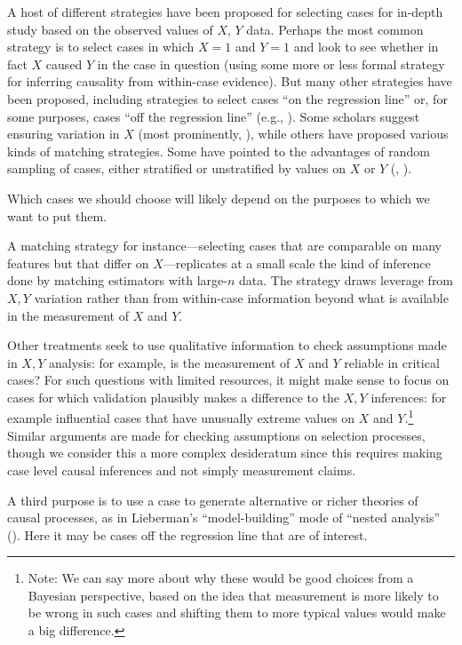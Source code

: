 \documentclass[
  12pt,
]{book}
\begin{document}
A host of different strategies have been proposed for selecting cases for in-depth study based on the observed values of \(X\), \(Y\) data. Perhaps the most common strategy is to select cases in which \(X=1\) and \(Y=1\) and look to see whether in fact \(X\) caused \(Y\) in the case in question (using some more or less formal strategy for inferring causality from within-case evidence). But many other strategies have been proposed, including strategies to select cases ``on the regression line'' or, for some purposes, cases ``off the regression line'' (e.g., \citet{Lieberman2005nested}). Some scholars suggest ensuring variation in \(X\) (most prominently, \citet{king1994designing}), while others have proposed various kinds of matching strategies. Some have pointed to the advantages of random sampling of cases, either stratified or unstratified by values on \(X\) or \(Y\) (\citet{FL2008}, \citet{HerronQuinn}).

Which cases we should choose will likely depend on the purposes to which we want to put them.

A matching strategy for instance---selecting cases that are comparable on many features but that differ on \(X\)---replicates at a small scale the kind of inference done by matching estimators with large-\(n\) data. The strategy draws leverage from \(X,Y\) variation rather than from within-case information beyond what is available in the measurement of \(X\) and \(Y\).

Other treatments seek to use qualitative information to check assumptions made in \(X, Y\) analysis: for example, is the measurement of \(X\) and \(Y\) reliable in critical cases?
For such questions with limited resources, it might make sense to focus on cases for which validation plausibly makes a difference to the \(X,Y\) inferences: for example influential cases that have unusually extreme values on \(X\) and \(Y\).\footnote{Note: We can say more about why these would be good choices from a Bayesian perspective, based on the idea that measurement is more likely to be wrong in such cases and shifting them to more typical values would make a big difference.} Similar arguments are made for checking assumptions on selection processes, though we consider this a more complex desideratum since this requires making case level causal inferences and not simply measurement claims.

A third purpose is to use a case to generate alternative or richer theories of causal processes, as in Lieberman's ``model-building'' mode of ``nested analysis'' (\citet{Lieberman2005nested}). Here it may be cases off the regression line that are of interest.
\end{document}
